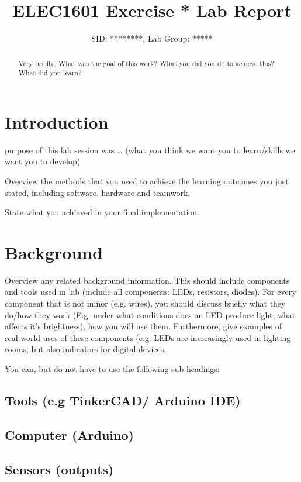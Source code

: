 \documentclass[journal]{IEEEtran}
\begin{document}
\title{ELEC1601 Exercise * Lab Report}

\author{SID: ********, Lab Group: *****}

\maketitle


\begin{abstract}
Very briefly: What was the goal of this work? What you did you do to achieve this? What did you learn?
\end{abstract}


\section{Introduction}

 purpose of this lab session was … (what you think we want you to learn/skills we want you to develop)

Overview the methods that you used to achieve the learning outcomes you just stated, including software, hardware and teamwork.

State what  you achieved in your final implementation.

\section{Background}
Overview any related background information. This should include components and tools used in lab (include all components: LEDs, resistors, diodes). For every component that is not minor (e.g. wires), you should discuss briefly what they do/how they work (E.g. under what conditions does an LED produce light, what affects it’s brightness), how you will use them. Furthermore, give examples of real-world uses of these components (e.g. LEDs are increasingly used in lighting rooms, but also indicators for digital devices.

You can, but do not have to use the following sub-headings:

\subsection{Tools (e.g TinkerCAD/ Arduino IDE)}
\subsection{Computer (Arduino)}
\subsection{Sensors (outputs)}
\end{document}
